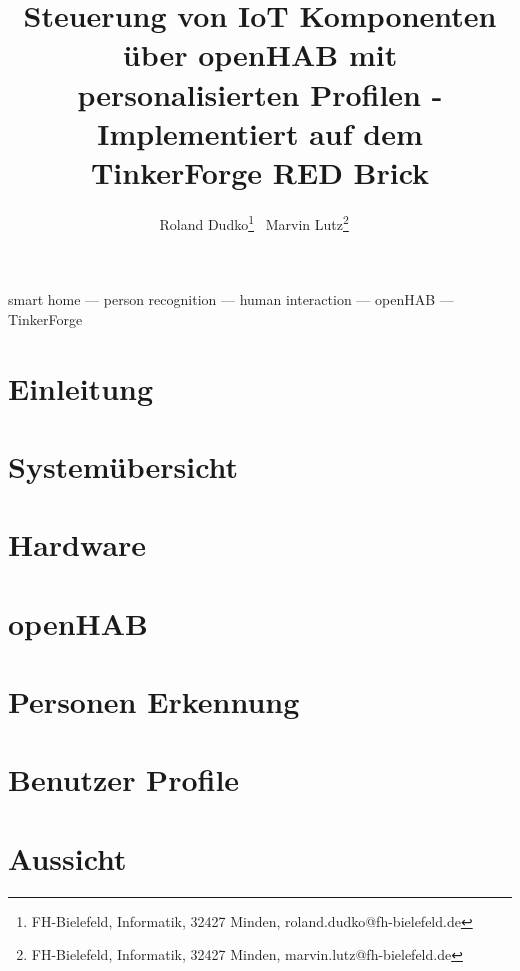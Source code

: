 \documentclass{lni}
\author{Roland Dudko\footnote{FH-Bielefeld, Informatik, 32427 Minden, roland.dudko@fh-bielefeld.de} \,
        Marvin Lutz\footnote{FH-Bielefeld, Informatik, 32427 Minden, marvin.lutz@fh-bielefeld.de} \ }
\title{Steuerung von IoT Komponenten über openHAB mit personalisierten Profilen - Implementiert auf dem TinkerForge RED Brick}
\renewcommand{\headrulewidth}{0.4pt} %
\begin{document}
\maketitle
\renewcommand{\refname}{Literaturverzeichnis}
\setcounter{footnote}{2} %

\begin{abstract}

\end{abstract}
\begin{keywords}
smart home --- person recognition --- human interaction --- openHAB --- TinkerForge
\end{keywords}

\section{Einleitung}


\pagestyle{fancy}
\fancyhead{} %
\fancyfoot{} %
\renewcommand{\headrulewidth}{0.4pt} %


\section{Systemübersicht}


\section{Hardware}


\section{openHAB}


\section{Personen Erkennung}


\section{Benutzer Profile}


\section{Aussicht}




\end{document}
